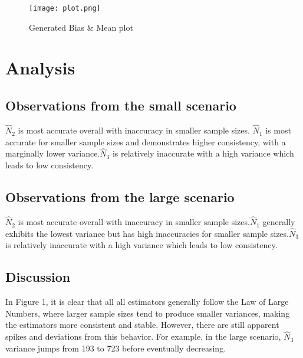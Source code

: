 \documentclass{report}
\begin{document}
\begin{figure}[H]
  \centering
  \texttt{[image: plot.png]}
  \caption{Generated Bias \& Mean plot}
  \label{fig:enter-label}
\end{figure}


\section{Analysis}

\subsection{Observations from the small scenario}


$\hat{N}_2$ is most accurate overall with inaccuracy in smaller sample sizes. $\hat{N}_1$ is most accurate for smaller sample sizes and demonstrates higher consistency, with a marginally lower variance.$\hat{N}_3$ is relatively inaccurate with a high variance which leads to low consistency.


\subsection{Observations from the large scenario}


$\hat{N}_2$ is most accurate overall with inaccuracy in smaller sample sizes.$\hat{N}_1$ generally exhibits the lowest variance but has high inaccuracies for smaller sample sizes.$\hat{N}_3$ is relatively inaccurate with a high variance which leads to low consistency.

\subsection{Discussion}

\begin{comment}
Figure 1 shows the mean estimations from the two experiments. The upper part of the figure for the small scenario and the lower part for the large scenario. It is observed that for all estimators, the variance decreases as the sample size increases, which aligns with the formula derived from the Central Limit Theorem.
\end{comment}

In Figure 1, it is clear that all all estimators generally follow the Law of Large Numbers, where larger sample sizes tend to produce smaller variances, making the estimators more consistent and stable. However, there are still apparent spikes and deviations from this behavior. For example, in the large scenario, $\hat{N}_3$ variance jumps from 193 to 723 before eventually decreasing.
\end{document}
